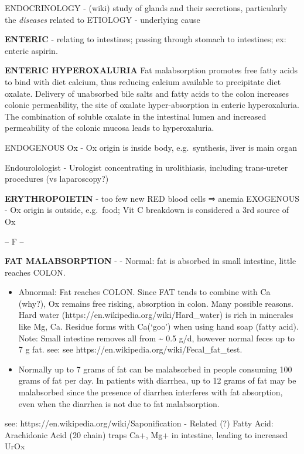 ENDOCRINOLOGY - (wiki) study of glands and their secretions,
particularly the \emph{diseases} related to ETIOLOGY - underlying cause

\textbf{ENTERIC} - relating to intestines; passing through stomach to
intestines; ex: enteric aspirin.

\textbf{ENTERIC HYPEROXALURIA} Fat malabsorption promotes free fatty
acids to bind with diet calcium, thus reducing calcium available to
precipitate diet oxalate. Delivery of unabsorbed bile salts and fatty
acids to the colon increases colonic permeability, the site of oxalate
hyper-absorption in enteric hyperoxaluria. The combination of soluble
oxalate in the intestinal lumen and increased permeability of the
colonic mucosa leads to hyperoxaluria.

ENDOGENOUS Ox - Ox origin is inside body, e.g.~synthesis, liver is main
organ

Endourolologist - Urologist concentrating in urolithiasis, including
trans-ureter procedures (vs laparoscopy?)

\textbf{ERYTHROPOIETIN} - too few new RED blood cells ⇒ anemia EXOGENOUS
- Ox origin is outside, e.g.~food; Vit C breakdown is considered a 3rd
source of Ox

-- F --

\textbf{FAT MALABSORPTION }- - Normal: fat is absorbed in small
intestine, little reaches COLON.

\begin{itemize}
\item
  Abnormal: Fat reaches COLON. Since FAT tends to combine with Ca
  (why?), Ox remains free risking, absorption in colon. Many possible
  reasons. Hard water (https://en.wikipedia.org/wiki/Hard\_water) is
  rich in minerales like Mg, Ca. Residue forms with Ca(`goo') when using
  hand soap (fatty acid). Note: Small intestine removes all from
  \textasciitilde{} 0.5 g/d, however normal feces up to 7 g fat. see:
  see https://en.wikipedia.org/wiki/Fecal\_fat\_test.
\item
  Normally up to 7 grams of fat can be malabsorbed in people consuming
  100 grams of fat per day. In patients with diarrhea, up to 12 grams of
  fat may be malabsorbed since the presence of diarrhea interferes with
  fat absorption, even when the diarrhea is not due to fat
  malabsorption.
\end{itemize}

see: https://en.wikipedia.org/wiki/Saponification - Related (?) Fatty
Acid: Arachidonic Acid (20 chain) traps Ca+, Mg+ in intestine, leading
to increased UrOx

